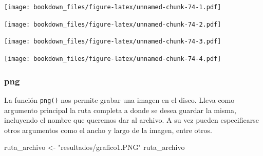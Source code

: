 \documentclass[]{book}
\newenvironment{Shaded}{\begin{snugshade}}{\end{snugshade}}
\newcommand{\CommentTok}[1]{\textcolor[rgb]{0.56,0.35,0.01}{\textit{#1}}}
\newcommand{\DataTypeTok}[1]{\textcolor[rgb]{0.13,0.29,0.53}{#1}}
\newcommand{\KeywordTok}[1]{\textcolor[rgb]{0.13,0.29,0.53}{\textbf{#1}}}
\newcommand{\NormalTok}[1]{#1}
\newcommand{\OperatorTok}[1]{\textcolor[rgb]{0.81,0.36,0.00}{\textbf{#1}}}
\newcommand{\StringTok}[1]{\textcolor[rgb]{0.31,0.60,0.02}{#1}}
\begin{document}
\texttt{[image: bookdown\_files/figure-latex/unnamed-chunk-74-1.pdf]}

\begin{Shaded}
\end{Shaded}

\texttt{[image: bookdown\_files/figure-latex/unnamed-chunk-74-2.pdf]}

\begin{Shaded}
\end{Shaded}

\texttt{[image: bookdown\_files/figure-latex/unnamed-chunk-74-3.pdf]}

\begin{Shaded}
\end{Shaded}

\texttt{[image: bookdown\_files/figure-latex/unnamed-chunk-74-4.pdf]}

\hypertarget{png}{%
\subsubsection{png}\label{png}}

La función \texttt{png()} nos permite grabar una imagen en el disco. Lleva como argumento principal la ruta completa a donde se desea guardar la misma, incluyendo el nombre que queremos dar al archivo. A su vez pueden especificarse otros argumentos como el ancho y largo de la imagen, entre otros.

\begin{Shaded}
\begin{Highlighting}[]
\NormalTok{ruta_archivo <-}\StringTok{ "resultados/grafico1.PNG"}
\NormalTok{ruta_archivo}
\end{Highlighting}
\end{Shaded}
\end{document}
